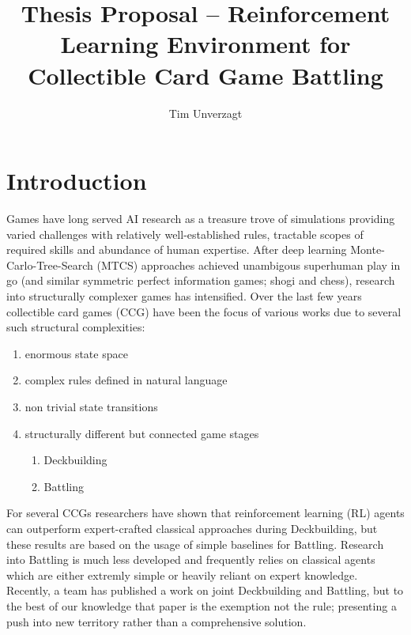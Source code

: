 \documentclass[
	english,%
	accentcolor=9c,%
	type=intern, %
	marginpar=false,%
]{tudapub}
\title{Thesis Proposal -- Reinforcement Learning Environment for Collectible Card Game Battling}
\author{Tim Unverzagt}
\begin{document}
\maketitle



\section{Introduction}
Games have long served AI research as a treasure trove of simulations providing varied challenges with relatively well-established rules, tractable scopes of required skills and abundance of human expertise.
After deep learning Monte-Carlo-Tree-Search (MTCS) approaches achieved unambigous superhuman play in go (and similar symmetric perfect information games; shogi and chess), research into structurally complexer games has intensified\cite{hu2024games}.
Over the last few years collectible card games (CCG) have been the focus of various works due to several such structural complexities:
\begin{enumerate}[topsep=3pt,itemsep=1pt,partopsep=0pt, parsep=0pt]
    \item enormous state space \cite{2020EvoDeckBuilding}
    \item complex rules defined in natural language \cite{2020DeepCardEvaluation}
    \item non trivial state transitions \cite{2016CombatComplexity}
    \item structurally different but connected game stages \cite{2023ByteRL}
        \begin{enumerate}
            \item Deckbuilding
            \item Battling
        \end{enumerate}
\end{enumerate}
For several CCGs researchers have shown that reinforcement learning (RL) agents can outperform expert-crafted classical approaches during Deckbuilding,
but these results are based on the usage of simple baselines for Battling.
Research into Battling is much less developed and frequently relies on classical agents which are either extremly simple or heavily reliant on expert knowledge.
Recently, a team has published a work on joint Deckbuilding and Battling, but to the best of our knowledge that paper\cite{2023ByteRL} is the exemption not the rule; presenting a push into new territory rather than a comprehensive solution.
\end{document}
